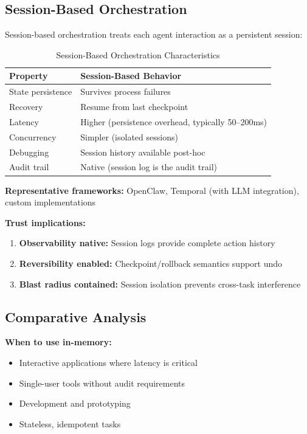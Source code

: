 \subsection{Session-Based Orchestration}
\label{subsec:session-orchestration}

Session-based orchestration treats each agent interaction as a persistent session:

\begin{table}[htbp]
\centering
\caption{Session-Based Orchestration Characteristics}
\label{tab:session-characteristics}
\begin{tabular}{ll}
\toprule
\textbf{Property} & \textbf{Session-Based Behavior} \\
\midrule
State persistence & Survives process failures \\
Recovery & Resume from last checkpoint \\
Latency & Higher (persistence overhead, typically 50--200ms) \\
Concurrency & Simpler (isolated sessions) \\
Debugging & Session history available post-hoc \\
Audit trail & Native (session log is the audit trail) \\
\bottomrule
\end{tabular}
\end{table}

\textbf{Representative frameworks:} OpenClaw, Temporal (with LLM integration), custom implementations

\textbf{Trust implications:}
\begin{enumerate}
    \item \textbf{Observability native:} Session logs provide complete action history
    \item \textbf{Reversibility enabled:} Checkpoint/rollback semantics support undo
    \item \textbf{Blast radius contained:} Session isolation prevents cross-task interference
\end{enumerate}

\subsection{Comparative Analysis}
\label{subsec:comparative-analysis}

\textbf{When to use in-memory:}
\begin{itemize}
    \item Interactive applications where latency is critical
    \item Single-user tools without audit requirements
    \item Development and prototyping
    \item Stateless, idempotent tasks
\end{itemize}

